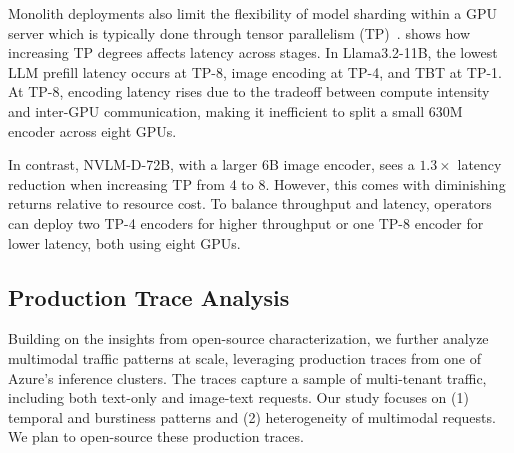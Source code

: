 \label{insight:4}



Monolith deployments also limit the flexibility of model sharding within a GPU server which is typically done through tensor parallelism (TP)~\cite{vllm-tp-pp}.
 shows how increasing TP degrees affects latency across \lmm{} stages.
In Llama3.2-11B, the lowest LLM prefill latency occurs at TP-8, image encoding at TP-4, and TBT at TP-1.
At TP-8, encoding latency rises due to the tradeoff between compute intensity and inter-GPU communication, making it inefficient to split a small 630M encoder across eight GPUs.

In contrast, NVLM-D-72B, with a larger 6B image encoder, sees a $1.3\times$ latency reduction when increasing TP from 4 to 8. However, this comes with diminishing returns relative to resource cost.
To balance throughput and latency, operators can deploy two TP-4 encoders for higher throughput or one TP-8 encoder for lower latency, both using eight GPUs.

\label{insight:5}

\subsection{Production \lmm{} Trace Analysis}
\label{sec:characterization:production}
Building on the insights from open-source \lmm{} characterization, we further analyze multimodal traffic patterns at scale, leveraging production traces from one of Azure's \lmm{} inference clusters.
The traces capture a sample of multi-tenant traffic, including both text-only and image-text requests.
Our study focuses on
(1) temporal and burstiness patterns and
(2) heterogeneity of multimodal requests.
We plan to open-source these production traces.



